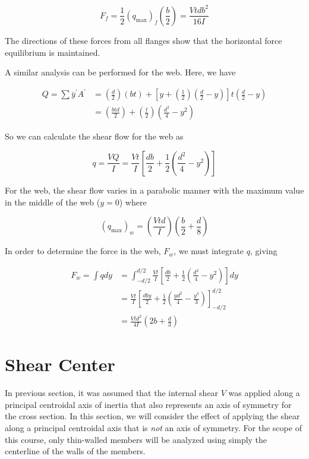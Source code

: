 \documentclass[
10pt,
a4paper,
openany,
svgnames,
]{book} %
\begin{document}
\[F_f = \frac{1}{2}(q_{\max })_f\left( \frac{b}{2} \right) = \frac{Vtdb^2}{16I}\]

The directions of these forces from all flanges show that the horizontal force equilibrium is maintained.

A similar analysis can be performed for the web. Here, we have

\begin{align*}
  Q = \sum \bar y^\prime A^\prime  &= \left( \frac{d}{2} \right)(bt) + \left[ y + \left( \frac{1}{2} \right)\left( \frac{d}{2} - y \right) \right]t\left( \frac{d}{2} - y \right) \\ 
                        &= \left( \frac{btd}{2} \right) + \left( \frac{t}{2} \right)\left( \frac{d^2}{4} - y^2 \right)
\end{align*}	

So we can calculate the shear flow for the web as

\begin{equation}
  q = \frac{VQ}{I} = \frac{Vt}{I}\left[ \frac{{db}}{2} + \frac{1}{2}\left( {\frac{d^2}{4} - y^2} \right) \right]
\end{equation}

For the web, the shear flow varies in a parabolic manner with the maximum value in the middle of the web ($y = 0$) where

\[(q_{\max })_w = \left( \frac{Vtd}{I} \right)\left( \frac{b}{2} + \frac{d}{8} \right)\]	

In order to determine the force in the web, $F_w$, we must integrate $q$, giving

\begin{align}
  {F_w} = \int {qdy}  &= \int_{ - d/2}^{d/2} {\frac{{Vt}}{I}\left[ {\frac{{db}}{2} + \frac{1}{2}\left( {\frac{{{d^2}}}{4} - {y^2}} \right)} \right]dy} \nonumber \\ 
   &= \frac{Vt}{I}\left[ \frac{dby}{2} + \frac{1}{2}\left( \frac{yd^2}{4} - \frac{y^3}{3} \right) \right]_{-d/2}^{d/2} \nonumber \\ 
   &= \frac{Vtd^2}{4I}\left( 2b + \frac{d}{3} \right)
\end{align}

\section{Shear Center}

In previous section, it was assumed that the internal shear $V$ was applied along a principal centroidal axis of inertia that also represents an axis of symmetry for the cross section. In this section, we will consider the effect of applying the shear along a principal centroidal axis that is \emph{not} an axis of symmetry. For the scope of this course, only thin-walled members will be analyzed using simply the centerline of the walls of the members.
\end{document}
